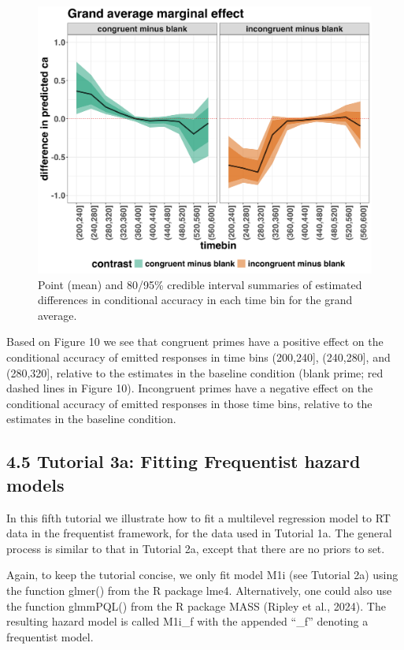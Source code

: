 \documentclass[
  man, donotrepeattitle,floatsintext]{apa6}
\begin{document}
\begin{figure}[H]

{\centering \includegraphics[width=0.8\linewidth,height=0.67\textheight,]{../Tutorial_2_Bayesian/figures/M1i_ca_grand_AME} 

}

\caption{Point (mean) and 80/95\% credible interval summaries of estimated differences in conditional accuracy in each time bin for the grand average.}\label{fig:plot-ca-grand-ame-effects}
\end{figure}

Based on Figure 10 we see that congruent primes have a positive effect on the conditional accuracy of emitted responses in time bins (200,240{]}, (240,280{]}, and (280,320{]}, relative to the estimates in the baseline condition (blank prime; red dashed lines in Figure 10).
Incongruent primes have a negative effect on the conditional accuracy of emitted responses in those time bins, relative to the estimates in the baseline condition.

\subsection{4.5 Tutorial 3a: Fitting Frequentist hazard models}\label{tutorial-3a-fitting-frequentist-hazard-models}

In this fifth tutorial we illustrate how to fit a multilevel regression model to RT data in the frequentist framework, for the data used in Tutorial 1a. The general process is similar to that in Tutorial 2a, except that there are no priors to set.

Again, to keep the tutorial concise, we only fit model M1i (see Tutorial 2a) using the function glmer() from the R package lme4. Alternatively, one could also use the function glmmPQL() from the R package MASS (Ripley et al., 2024). The resulting hazard model is called M1i\_f with the appended ``\_f'' denoting a frequentist model.
\end{document}
